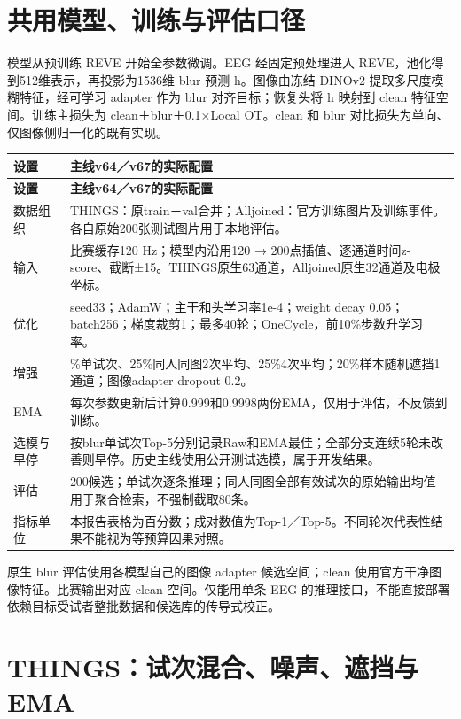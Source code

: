 \documentclass[UTF8,a4paper,11pt,fontset=none]{ctexart}
\begin{document}
\section{共用模型、训练与评估口径}
模型从预训练 REVE 开始全参数微调。EEG 经固定预处理进入 REVE，池化得到512维表示，再投影为1536维 blur 预测 h。图像由冻结 DINOv2 提取多尺度模糊特征，经可学习 adapter 作为 blur 对齐目标；恢复头将 h 映射到 clean 特征空间。训练主损失为 clean＋blur＋0.1×Local OT。clean 和 blur 对比损失为单向、仅图像侧归一化的既有实现。

{\small
\begin{longtable}{>{\raggedright\arraybackslash}p{3.368cm}>{\raggedright\arraybackslash}p{13.470cm}}
\toprule
\textbf{设置} & \textbf{主线v64／v67的实际配置} \\
\midrule\endfirsthead
\textbf{设置} & \textbf{主线v64／v67的实际配置} \\
\midrule\endhead
\bottomrule\endfoot
数据组织 & THINGS：原train＋val合并；Alljoined：官方训练图片及训练事件。各自原始200张测试图片用于本地评估。 \\
输入 & 比赛缓存120 Hz；模型内沿用120 → 200点插值、逐通道时间z-score、截断±15。THINGS原生63通道，Alljoined原生32通道及电极坐标。 \\
优化 & seed33；AdamW；主干和头学习率1e-4；weight decay 0.05；batch256；梯度裁剪1；最多40轮；OneCycle，前10\%步数升学习率。 \\
增强 & 50\%单试次、25\%同人同图2次平均、25\%4次平均；20\%样本随机遮挡1通道；图像adapter dropout 0.2。 \\
EMA & 每次参数更新后计算0.999和0.9998两份EMA，仅用于评估，不反馈到训练。 \\
选模与早停 & 按blur单试次Top-5分别记录Raw和EMA最佳；全部分支连续5轮未改善则早停。历史主线使用公开测试选模，属于开发结果。 \\
评估 & 200候选；单试次逐条推理；同人同图全部有效试次的原始输出均值用于聚合检索，不强制截取80条。 \\
指标单位 & 本报告表格为百分数；成对数值为Top-1／Top-5。不同轮次代表性结果不能视为等预算因果对照。 \\
\end{longtable}
}
原生 blur 评估使用各模型自己的图像 adapter 候选空间；clean 使用官方干净图像特征。比赛输出对应 clean 空间。仅能用单条 EEG 的推理接口，不能直接部署依赖目标受试者整批数据和候选库的传导式校正。

\section{THINGS：试次混合、噪声、遮挡与EMA}
\end{document}
